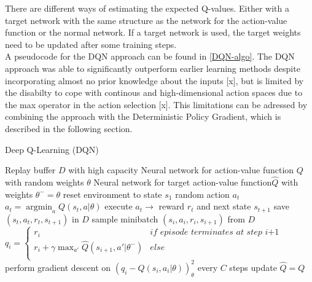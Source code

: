 There are different ways of estimating the expected Q-values. Either with a target network with the same structure as the network for the action-value function or the normal network. If a target network is used, the target weights need to be updated after some 
training steps.\\
A pseudocode for the DQN approach can be found in \ref{DQN-algo}.
The DQN approach was able to significantly outperform earlier learning methods despite incorporating almost no prior knowledge about the inputs [x], but is limited by the disabilty to cope with continous and high-dimensional action spaces due to the max operator in the action selection [x]. This limitations can be adressed by combining the approach with the Deterministic Policy Gradient, which is described in the following section.

\begin{algorithm}
	\caption{Deep Q-Learning (DQN)}\label{DQN-algo}
	\begin{algorithmic}
		\REQUIRE Replay buffer $\mathit{D}$ with high capacity
		\REQUIRE Neural network for action-value function $\mathit{Q}$
		with random weights $\theta$
		\REQUIRE Neural network for target action-value function$
		\mathit{\hat{Q}}$ with weights $\theta^-=\theta$
		\STATE reset environment to state $s_1$
		\STATE random action $a_t$
		\ELSE
		\STATE $a_t=\operatorname*{argmin}_a Q(s_t,a|\theta)$
		\ENDIF
		\STATE execute $a_t \rightarrow$ reward $r_t$ and next state 
		$s_{t+1}$
		\STATE save $(s_t, a_t, r_t,s_{t+1})$ in $D$
		\STATE sample minibatch $(s_i, a_i, r_i,s_{i+1})$ from $D$
		\STATE $q_i =
			\begin{cases}
			r_i & \textit{if episode terminates at step i+1}\\
			r_i+\gamma \max_{a'}\hat{Q}(s_{i+1}, a'|\theta^{-})& 
			else\\			
			\end{cases}$
		\STATE perform gradient descent on $\left(q_i-Q\left(s_i, 
		a_i|\theta\right)\right)^2_\theta$
		\STATE every $C$ steps update $\hat{Q}=Q$
		\ENDFOR
		\ENDFOR
	\end{algorithmic}
\end{algorithm}


